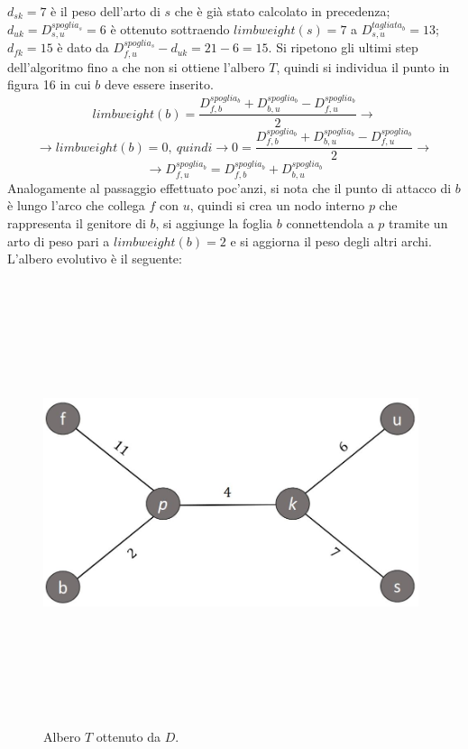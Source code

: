 $d_{sk}=7$ è il peso dell'arto di $s$ che è già stato calcolato in precedenza; $d_{uk}=D^{spoglia_{s}}_{s,u}=6$ è ottenuto sottraendo $limbweight(s)=7$ a \newline $D^{tagliata_{b}}_{s,u}=13$; $d_{fk}=15$ è dato da $D^{spoglia_{s}}_{f,u}-d_{uk}=21-6=15$.
\newline
Si ripetono gli ultimi step dell'algoritmo fino a che non si ottiene l'albero $T$, quindi si individua il punto in figura 16 in cui $b$ deve essere inserito.
\[
limbweight(b)=\frac{D^{spoglia_{b}}_{f,b}+D^{spoglia_{b}}_{b,u}-D^{spoglia_{b}}_{f,u}}{2} \rightarrow\]
\[ \rightarrow limbweight(b)=0,\: quindi\rightarrow 0=\frac{D^{spoglia_{b}}_{f,b}+D^{spoglia_{b}}_{b,u}-D^{spoglia_{b}}_{f,u}}{2}\rightarrow\]
\[\rightarrow D^{spoglia_{b}}_{f,u}=D^{spoglia_{b}}_{f,b}+D^{spoglia_{b}}_{b,u}
\]
Analogamente al passaggio effettuato poc'anzi, si nota che il punto di attacco di $b$ è lungo l'arco che collega $f$ con $u$, quindi si crea un nodo interno $p$ che rappresenta il genitore di $b$,
si aggiunge la foglia $b$ connettendola a $p$ tramite un arto di peso pari a
$limbweight(b)=2$ e si aggiorna il peso degli altri archi.
\newpage
L'albero evolutivo è il seguente:
\begin{figure}[h!]
\centering
	\includegraphics[height=13cm, width=11cm, keepaspectratio]{additive_tree_4.jpg}
 	\caption{Albero $T$ ottenuto da $D$.}
  	\label{fig:additivePhylogeny_4}
\end{figure}

